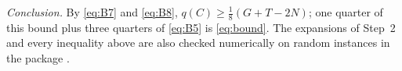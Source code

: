 \documentclass[aps,pra,twocolumn,superscriptaddress,nofootinbib,longbibliography]{revtex4-2}
\theoremstyle{plain}
\theoremstyle{definition}
\theoremstyle{remark}
\begin{document}
\emph{Conclusion.} By \eqref{eq:B7} and \eqref{eq:B8}, $q(C)\ge\tfrac18(G+T-2N)$; one quarter of this bound plus three quarters of \eqref{eq:B5} is \eqref{eq:bound}. The expansions of Step~2 and every inequality above are also checked numerically on random instances in the package \cite{Pkg}.


\end{document}

